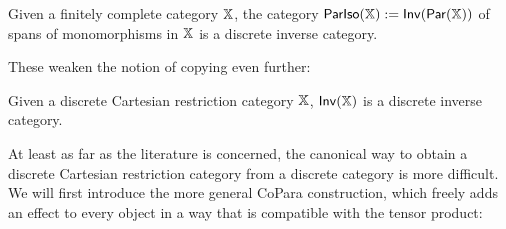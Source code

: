 \begin{lemma}
\label{def:pariso}
Given a finitely complete category $\mathbb{X}$, the category  $\mathsf{ParIso}(\mathbb{X}):=\mathsf{Inv}(\mathsf{Par}(\mathbb{X}))$ of spans of monomorphisms in $\mathbb{X}$ is a discrete inverse category.
\end{lemma}
These weaken the notion of copying even further:
\begin{lemma}
Given a discrete Cartesian restriction category $\mathbb{X}$, $\mathsf{Inv}(\mathbb{X})$ is a discrete inverse category.
\end{lemma}
At least as far as the literature is concerned, the canonical way to obtain a discrete Cartesian restriction category from a discrete category is more difficult.  We will first introduce the more general CoPara construction, which freely adds an effect to every object in a way that is compatible with the tensor product:

